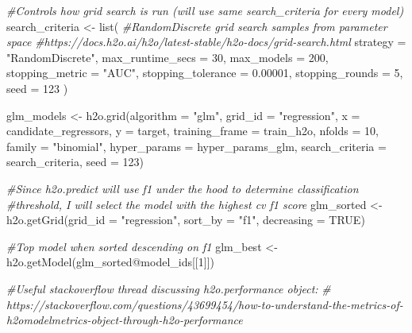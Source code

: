 \documentclass[
]{article}
\newenvironment{Shaded}{\begin{snugshade}}{\end{snugshade}}
\newcommand{\AttributeTok}[1]{\textcolor[rgb]{0.77,0.63,0.00}{#1}}
\newcommand{\CommentTok}[1]{\textcolor[rgb]{0.56,0.35,0.01}{\textit{#1}}}
\newcommand{\ConstantTok}[1]{\textcolor[rgb]{0.00,0.00,0.00}{#1}}
\newcommand{\DecValTok}[1]{\textcolor[rgb]{0.00,0.00,0.81}{#1}}
\newcommand{\FloatTok}[1]{\textcolor[rgb]{0.00,0.00,0.81}{#1}}
\newcommand{\FunctionTok}[1]{\textcolor[rgb]{0.00,0.00,0.00}{#1}}
\newcommand{\NormalTok}[1]{#1}
\newcommand{\OtherTok}[1]{\textcolor[rgb]{0.56,0.35,0.01}{#1}}
\newcommand{\SpecialCharTok}[1]{\textcolor[rgb]{0.00,0.00,0.00}{#1}}
\newcommand{\StringTok}[1]{\textcolor[rgb]{0.31,0.60,0.02}{#1}}
\begin{document}
\begin{Shaded}
\begin{Highlighting}[]
\CommentTok{\#Controls how grid search is run (will use same search\_criteria for every model)}
\NormalTok{search\_criteria }\OtherTok{\textless{}{-}} \FunctionTok{list}\NormalTok{(}
  \CommentTok{\#RandomDiscrete grid search samples from parameter space}
  \CommentTok{\#https://docs.h2o.ai/h2o/latest{-}stable/h2o{-}docs/grid{-}search.html}
  \AttributeTok{strategy =} \StringTok{"RandomDiscrete"}\NormalTok{,}
  \AttributeTok{max\_runtime\_secs =} \DecValTok{30}\NormalTok{,}
  \AttributeTok{max\_models =} \DecValTok{200}\NormalTok{,}
  \AttributeTok{stopping\_metric =} \StringTok{"AUC"}\NormalTok{, }
  \AttributeTok{stopping\_tolerance =} \FloatTok{0.00001}\NormalTok{, }
  \AttributeTok{stopping\_rounds =} \DecValTok{5}\NormalTok{, }
  \AttributeTok{seed =} \DecValTok{123}
\NormalTok{)}

\NormalTok{glm\_models }\OtherTok{\textless{}{-}} \FunctionTok{h2o.grid}\NormalTok{(}\AttributeTok{algorithm =} \StringTok{"glm"}\NormalTok{,}
                       \AttributeTok{grid\_id =} \StringTok{"regression"}\NormalTok{,}
                       \AttributeTok{x =}\NormalTok{ candidate\_regressors, }
                       \AttributeTok{y =}\NormalTok{ target, }
                       \AttributeTok{training\_frame =}\NormalTok{ train\_h2o,}
                       \AttributeTok{nfolds =} \DecValTok{10}\NormalTok{, }
                       \AttributeTok{family =} \StringTok{"binomial"}\NormalTok{, }
                       \AttributeTok{hyper\_params =}\NormalTok{ hyper\_params\_glm, }
                       \AttributeTok{search\_criteria =}\NormalTok{ search\_criteria,}
                       \AttributeTok{seed =} \DecValTok{123}\NormalTok{)}

\CommentTok{\#Since h2o.predict will use f1 under the hood to determine classification }
\CommentTok{\#threshold, I will select the model with the highest cv f1 score}
\NormalTok{glm\_sorted }\OtherTok{\textless{}{-}} \FunctionTok{h2o.getGrid}\NormalTok{(}\AttributeTok{grid\_id =} \StringTok{"regression"}\NormalTok{, }\AttributeTok{sort\_by =} \StringTok{"f1"}\NormalTok{, }\AttributeTok{decreasing =} \ConstantTok{TRUE}\NormalTok{)}

\CommentTok{\#Top model when sorted descending on f1}
\NormalTok{glm\_best }\OtherTok{\textless{}{-}} \FunctionTok{h2o.getModel}\NormalTok{(glm\_sorted}\SpecialCharTok{@}\NormalTok{model\_ids[[}\DecValTok{1}\NormalTok{]])}


\CommentTok{\#Useful stackoverflow thread discussing h2o.performance object:}
\CommentTok{\# https://stackoverflow.com/questions/43699454/how{-}to{-}understand{-}the{-}metrics{-}of{-}h2omodelmetrics{-}object{-}through{-}h2o{-}performance}


\end{Highlighting}
\end{Shaded}
\end{document}
